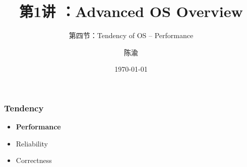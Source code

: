 


\title[第1讲]{第1讲 ：Advanced OS Overview} %
\subtitle{第四节：Tendency of OS -- Performance}
\author{陈渝} %
\date{\today} %




\begin{frame}
\titlepage %
\end{frame}

%
%
\begin{frame}[plain]
	\frametitle{Tendency}

	\begin{itemize}\huge
	\item \textbf{Performance}
	\item Reliability
	\item Correctness
	
\end{itemize}
\end{frame}


